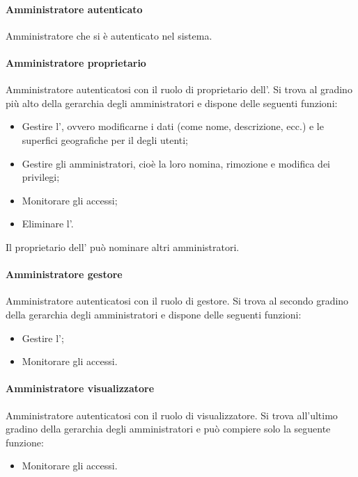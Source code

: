 \paragraph{Amministratore autenticato}
Amministratore che si è autenticato nel sistema.
\paragraph{Amministratore proprietario}
Amministratore autenticatosi con il ruolo di proprietario dell'.
Si trova al gradino più alto della gerarchia degli amministratori e dispone delle seguenti funzioni:
\begin{itemize}
\item Gestire l', ovvero modificarne i dati (come nome, descrizione, ecc.) e le superfici geografiche per il  degli utenti;
\item Gestire gli amministratori, cioè la loro nomina, rimozione e modifica dei privilegi;
\item Monitorare gli accessi;
\item Eliminare l'.
\end{itemize}
Il proprietario dell' può nominare altri amministratori.
\paragraph{Amministratore gestore}
Amministratore autenticatosi con il ruolo di gestore. 
Si trova al secondo gradino della gerarchia degli amministratori e dispone delle seguenti funzioni:
\begin{itemize}
\item Gestire l';
\item Monitorare gli accessi.
\end{itemize}
\paragraph{Amministratore visualizzatore}
Amministratore autenticatosi con il ruolo di visualizzatore.
Si trova all'ultimo gradino della gerarchia degli amministratori e può compiere solo la seguente funzione:
\begin{itemize}
\item Monitorare gli accessi.
\end{itemize}




